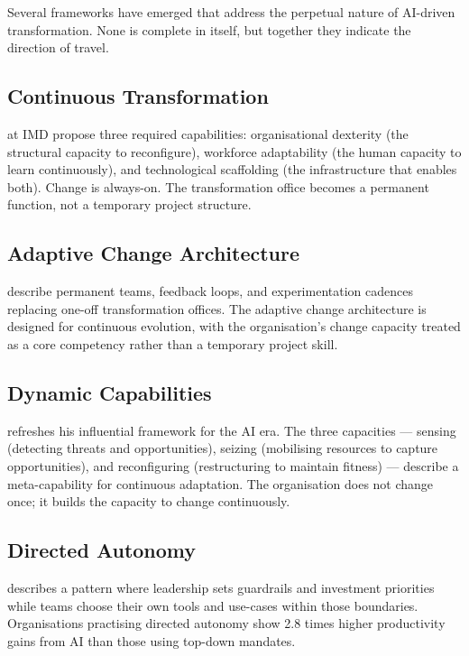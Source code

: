Several frameworks have emerged that address the perpetual nature of AI-driven transformation. None is complete in itself, but together they indicate the direction of travel.

\subsection{Continuous Transformation}

\textcite{WadeBonnet2025} at IMD propose three required capabilities: organisational dexterity (the structural capacity to reconfigure), workforce adaptability (the human capacity to learn continuously), and technological scaffolding (the infrastructure that enables both). Change is always-on. The transformation office becomes a permanent function, not a temporary project structure.

\subsection{Adaptive Change Architecture}

\textcite{Deloitte2026} describe permanent teams, feedback loops, and experimentation cadences replacing one-off transformation offices. The adaptive change architecture is designed for continuous evolution, with the organisation's change capacity treated as a core competency rather than a temporary project skill.

\subsection{Dynamic Capabilities}

\textcite{Teece2025} refreshes his influential framework for the AI era. The three capacities --- sensing (detecting threats and opportunities), seizing (mobilising resources to capture opportunities), and reconfiguring (restructuring to maintain fitness) --- describe a meta-capability for continuous adaptation. The organisation does not change once; it builds the capacity to change continuously.

\subsection{Directed Autonomy}

\textcite{MicrosoftDirectedAutonomy2025} describes a pattern where leadership sets guardrails and investment priorities while teams choose their own tools and use-cases within those boundaries. Organisations practising directed autonomy show 2.8 times higher productivity gains from AI than those using top-down mandates.

